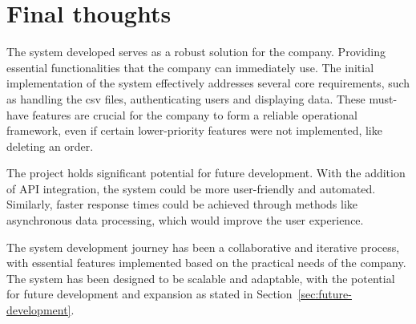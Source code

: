 \section{Final thoughts}\label{sec:final-thoughts}

The system developed serves as a robust solution for the company.
Providing essential functionalities that the company can immediately use.
The initial implementation of the system effectively addresses several core requirements, such as handling the
csv files, authenticating users and displaying data.
These must-have features are crucial for the company to form a reliable operational framework, even if certain
lower-priority features were not implemented, like deleting an order.

The project holds significant potential for future development.
With the addition of API integration, the system could be more user-friendly and automated.
Similarly, faster response times could be achieved through methods like asynchronous data processing, which would
improve the user experience.

The system development journey has been a collaborative and iterative process, with essential features implemented
based on the practical needs of the company.
The system has been designed to be scalable and adaptable, with the potential for future development and expansion as
stated in Section~\ref{sec:future-development}.
